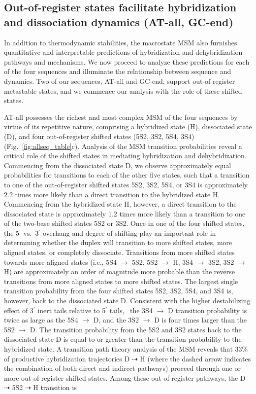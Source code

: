 \documentclass[journal=jpcbfk,manuscript=article]{achemso}
\begin{document}
\subsection{Out-of-register states facilitate hybridization and dissociation dynamics (AT-all, GC-end)}

In addition to thermodynamic stabilities, the macrostate MSM also furnishes quantitative and interpretable predictions of hybridization and dehybridization pathways and mechanisms. We now proceed to analyze these predictions for each of the four sequences and illuminate the relationship between sequence and dynamics. Two of our sequences, AT-all and GC-end, support out-of-register metastable states, and we commence our analysis with the role of these shifted states.

AT-all possesses the richest and most complex MSM of the four sequences by virtue of its repetitive nature, comprising a hybridized state (H), dissociated state (D), and four out-of-register shifted states (5S2, 3S2, 5S4, 3S4) (Fig.~\ref{fig:allseq_table}c). Analysis of the MSM transition probabilities reveal a critical role of the shifted states in mediating hybridization and dehybridization. Commencing from the dissociated state D, we observe approximately equal probabilities for transitions to each of the other five states, such that a transition to one of the out-of-register shifted states 5S2, 3S2, 5S4, or 3S4 is approximately 2.2 times more likely than a direct transition to the hybridized state H. Commencing from the hybridized state H, however, a direct transition to the dissociated state is approximately 1.2 times more likely than a transition to one of the two-base shifted states 5S2 or 3S2. Once in one of the four shifted states, the 5$^\prime$ vs.\ 3$^\prime$ overhang and degree of shifting play an important role in determining whether the duplex will transition to more shifted states, more aligned states, or completely dissociate. Transitions from more shifted states towards more aligned states (i.e., 5S4 $\rightarrow$ 5S2, 5S2 $\rightarrow$ H, 3S4 $\rightarrow$ 3S2, 3S2 $\rightarrow$ H) are approximately an order of magnitude more probable than the reverse transitions from more aligned states to more shifted states. The largest single transition probability from the four shifted states 5S2, 3S2, 5S4, and 3S4 is, however, back to the dissociated state D. Consistent with the higher destabilizing effect of 3$^\prime$ inert tails relative to 5$^\prime$ tails,~\citep{Doktycz1990ThermodynamicC, Dickman2012ThermodynamicDNAs, DiMichele2014EffectHybridization} the 3S4 $\rightarrow$ D transition probability is twice as large as the 5S4 $\rightarrow$ D, and the 3S2 $\rightarrow$ D is four times larger than the 5S2 $\rightarrow$ D. The transition probability from the 5S2 and 3S2 states back to the dissociated state D is equal to or greater than the transition probability to the hybridized state. A transition path theory analysis of the MSM reveals that 33\% of productive hybridization trajectories D $\dashrightarrow$ H (where the dashed arrow indicates the combination of both direct and indirect pathways) proceed through one or more out-of-register shifted states. Among these out-of-register pathways, the D $\dashrightarrow$ 5S2 $\dashrightarrow$ H transition is 
\end{document}
